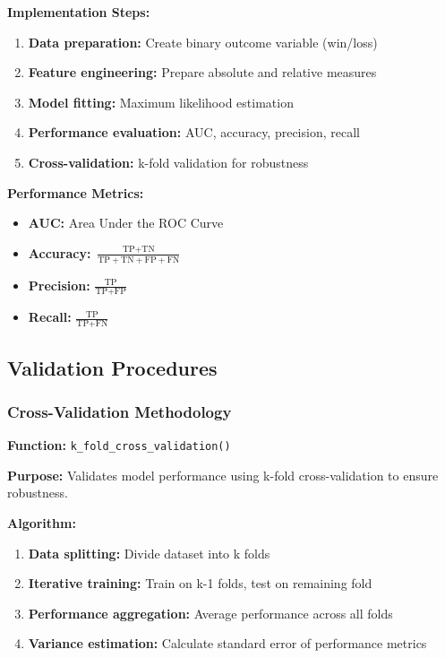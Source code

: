 \textbf{Implementation Steps:}
\begin{enumerate}
    \item \textbf{Data preparation:} Create binary outcome variable (win/loss)
    \item \textbf{Feature engineering:} Prepare absolute and relative measures
    \item \textbf{Model fitting:} Maximum likelihood estimation
    \item \textbf{Performance evaluation:} AUC, accuracy, precision, recall
    \item \textbf{Cross-validation:} k-fold validation for robustness
\end{enumerate}

\textbf{Performance Metrics:}
\begin{itemize}
    \item \textbf{AUC:} Area Under the ROC Curve
    \item \textbf{Accuracy:} $\frac{\text{TP} + \text{TN}}{\text{TP} + \text{TN} + \text{FP} + \text{FN}}$
    \item \textbf{Precision:} $\frac{\text{TP}}{\text{TP} + \text{FP}}$
    \item \textbf{Recall:} $\frac{\text{TP}}{\text{TP} + \text{FN}}$
\end{itemize}

\subsection{Validation Procedures}

\subsubsection{Cross-Validation Methodology}

\textbf{Function:} \texttt{k\_fold\_cross\_validation()}

\textbf{Purpose:} Validates model performance using k-fold cross-validation to ensure robustness.

\textbf{Algorithm:}
\begin{enumerate}
    \item \textbf{Data splitting:} Divide dataset into k folds
    \item \textbf{Iterative training:} Train on k-1 folds, test on remaining fold
    \item \textbf{Performance aggregation:} Average performance across all folds
    \item \textbf{Variance estimation:} Calculate standard error of performance metrics
\end{enumerate}

